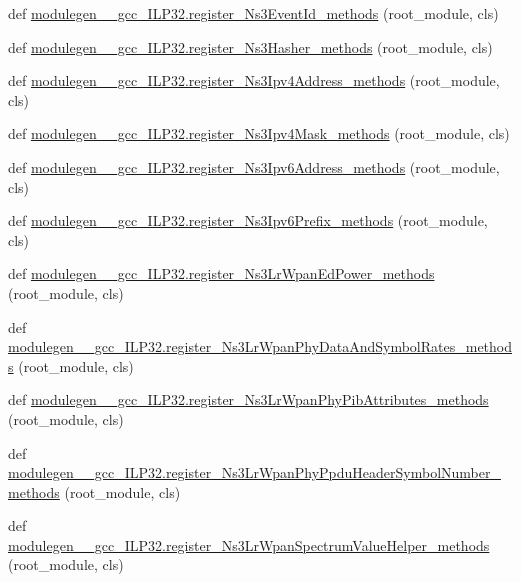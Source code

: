 \begin{DoxyCompactItemize}
def \hyperlink{namespacemodulegen____gcc__ILP32_a380e15c15390ba7c3f21a3162cb67911}{modulegen\+\_\+\+\_\+gcc\+\_\+\+I\+L\+P32.\+register\+\_\+\+Ns3\+Event\+Id\+\_\+methods} (root\+\_\+module, cls)
\item 
def \hyperlink{namespacemodulegen____gcc__ILP32_a33425c5d69b8b6e93c725709f6aa95fb}{modulegen\+\_\+\+\_\+gcc\+\_\+\+I\+L\+P32.\+register\+\_\+\+Ns3\+Hasher\+\_\+methods} (root\+\_\+module, cls)
\item 
def \hyperlink{namespacemodulegen____gcc__ILP32_a3a069cad6e59687195ff869fd35923d3}{modulegen\+\_\+\+\_\+gcc\+\_\+\+I\+L\+P32.\+register\+\_\+\+Ns3\+Ipv4\+Address\+\_\+methods} (root\+\_\+module, cls)
\item 
def \hyperlink{namespacemodulegen____gcc__ILP32_a4f3623d807ca57aa642b7e9d784b1747}{modulegen\+\_\+\+\_\+gcc\+\_\+\+I\+L\+P32.\+register\+\_\+\+Ns3\+Ipv4\+Mask\+\_\+methods} (root\+\_\+module, cls)
\item 
def \hyperlink{namespacemodulegen____gcc__ILP32_acc57372433d228dd060a3165e8c17c71}{modulegen\+\_\+\+\_\+gcc\+\_\+\+I\+L\+P32.\+register\+\_\+\+Ns3\+Ipv6\+Address\+\_\+methods} (root\+\_\+module, cls)
\item 
def \hyperlink{namespacemodulegen____gcc__ILP32_aa8595c3a98eeb16457cb2bea21656ecd}{modulegen\+\_\+\+\_\+gcc\+\_\+\+I\+L\+P32.\+register\+\_\+\+Ns3\+Ipv6\+Prefix\+\_\+methods} (root\+\_\+module, cls)
\item 
def \hyperlink{namespacemodulegen____gcc__ILP32_ab878202dd0c8bdd6e05befed17ee31f8}{modulegen\+\_\+\+\_\+gcc\+\_\+\+I\+L\+P32.\+register\+\_\+\+Ns3\+Lr\+Wpan\+Ed\+Power\+\_\+methods} (root\+\_\+module, cls)
\item 
def \hyperlink{namespacemodulegen____gcc__ILP32_ad9cf3fbcadd62cfefe101f2a3b9daf31}{modulegen\+\_\+\+\_\+gcc\+\_\+\+I\+L\+P32.\+register\+\_\+\+Ns3\+Lr\+Wpan\+Phy\+Data\+And\+Symbol\+Rates\+\_\+methods} (root\+\_\+module, cls)
\item 
def \hyperlink{namespacemodulegen____gcc__ILP32_ab7ffb844626bc3a7319ba857df6701e7}{modulegen\+\_\+\+\_\+gcc\+\_\+\+I\+L\+P32.\+register\+\_\+\+Ns3\+Lr\+Wpan\+Phy\+Pib\+Attributes\+\_\+methods} (root\+\_\+module, cls)
\item 
def \hyperlink{namespacemodulegen____gcc__ILP32_a78400d0bd7da7fd24e003f255a375478}{modulegen\+\_\+\+\_\+gcc\+\_\+\+I\+L\+P32.\+register\+\_\+\+Ns3\+Lr\+Wpan\+Phy\+Ppdu\+Header\+Symbol\+Number\+\_\+methods} (root\+\_\+module, cls)
\item 
def \hyperlink{namespacemodulegen____gcc__ILP32_a20e9beb2a07c343a61de1db9569701a4}{modulegen\+\_\+\+\_\+gcc\+\_\+\+I\+L\+P32.\+register\+\_\+\+Ns3\+Lr\+Wpan\+Spectrum\+Value\+Helper\+\_\+methods} (root\+\_\+module, cls)

\end{DoxyCompactItemize}

